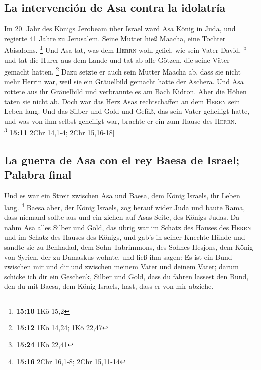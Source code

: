 \hypertarget{la-intervenciuxf3n-de-asa-contra-la-idolatruxeda}{%
\subsection{La intervención de Asa contra la
idolatría}\label{la-intervenciuxf3n-de-asa-contra-la-idolatruxeda}}

 Im 20. Jahr des Königs Jerobeam über Israel ward Asa
König in Juda,  und regierte 41 Jahre zu Jerusalem. Seine
Mutter hieß Maacha, eine Tochter Abisaloms. \footnote{\textbf{15:10} 1Kö
  15,2}  Und Asa tat, was dem \textsc{Herrn} wohl gefiel,
wie sein Vater David, \textsuperscript{b}  und tat die
Hurer aus dem Lande und tat ab alle Götzen, die seine Väter gemacht
hatten. \footnote{\textbf{15:12} 1Kö 14,24; 1Kö 22,47} 
Dazu setzte er auch sein Mutter Maacha ab, dass sie nicht mehr Herrin
war, weil sie ein Gräuelbild gemacht hatte der Aschera. Und Asa rottete
aus ihr Gräuelbild und verbrannte es am Bach Kidron. 
Aber die Höhen taten sie nicht ab. Doch war das Herz Asas rechtschaffen
an dem \textsc{Herrn} sein Leben lang.  Und das Silber
und Gold und Gefäß, das sein Vater geheiligt hatte, und was von ihm
selbst geheiligt war, brachte er ein zum Hause des \textsc{Herrn}.
\footnote{\textbf{15:24} 1Kö 22,41}{[}\textbf{15:11} 2Chr 14,1-4; 2Chr
15,16-18{]}

\hypertarget{la-guerra-de-asa-con-el-rey-baesa-de-israel-palabra-final}{%
\subsection{La guerra de Asa con el rey Baesa de Israel; Palabra
final}\label{la-guerra-de-asa-con-el-rey-baesa-de-israel-palabra-final}}

 Und es war ein Streit zwischen Asa und Baesa, dem König
Israels, ihr Leben lang. \footnote{\textbf{15:16} 2Chr 16,1-8; 2Chr
  15,11-14}  Baesa aber, der König Israels, zog herauf
wider Juda und baute Rama, dass niemand sollte aus und ein ziehen auf
Asas Seite, des Königs Judas.  Da nahm Asa alles Silber
und Gold, das übrig war im Schatz des Hauses des \textsc{Herrn} und im
Schatz des Hauses des Königs, und gab's in seiner Knechte Hände und
sandte sie zu Benhadad, dem Sohn Tabrimmons, des Sohnes Hesjons, dem
König von Syrien, der zu Damaskus wohnte, und ließ ihm sagen:
 Es ist ein Bund zwischen mir und dir und zwischen meinem
Vater und deinem Vater; darum schicke ich dir ein Geschenk, Silber und
Gold, dass du fahren lassest den Bund, den du mit Baesa, dem König
Israels, hast, dass er von mir abziehe.

